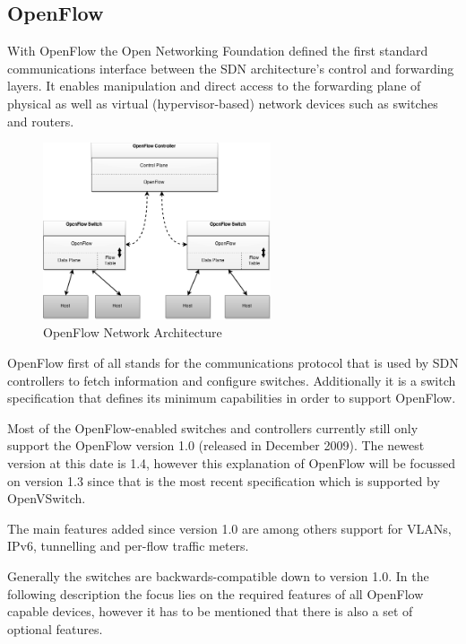 \subsection{OpenFlow}


With OpenFlow the Open Networking Foundation defined the first standard communications interface between the SDN architecture's control and forwarding layers. It enables manipulation and direct access to the forwarding plane of physical as well as virtual (hypervisor-based) network devices such as switches and routers. \cite{onfnewnorm}

\begin{figure}[H]
\centering

\includegraphics[width=0.6\textwidth]{images/fundamentals/openflow_architecture.png}

\caption{OpenFlow Network Architecture}
\end{figure}

OpenFlow first of all stands for the communications protocol that is used by SDN controllers to fetch information and configure switches. Additionally it is a switch specification that defines its minimum capabilities in order to support OpenFlow.


Most of the OpenFlow-enabled switches and controllers currently still only support the OpenFlow version 1.0 (released in December 2009). The newest version at this date is 1.4, however this explanation of OpenFlow will be focussed on version 1.3 since that is the most recent specification which is supported by OpenVSwitch.

The main features added since version 1.0 are among others support for VLANs, IPv6, tunnelling and per-flow traffic meters. \cite{ofversion13}

Generally the switches are backwards-compatible down to version 1.0. In the following description the focus lies on the required features of all OpenFlow capable devices, however it has to be mentioned that there is also a set of optional features.

